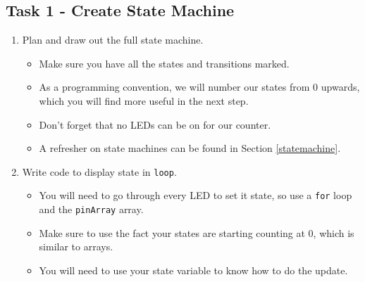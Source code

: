 \documentclass{article}
\begin{document}
    \subsection{Task 1 - Create State Machine}
        \begin{enumerate}
            \item Plan and draw out the full state machine.
            \begin{itemize}
                \item Make sure you have all the states and transitions marked. 
                \item As a programming convention, we will number our states from 0 upwards, which you will find more useful in the next step.
                \item Don't forget that no LEDs can be on for our counter.
                \item A refresher on state machines can be found in Section \ref{statemachine}.
            \end{itemize}
            \item Write code to display state in \texttt{loop}.
            \begin{itemize}
                \item You will need to go through every LED to set it state, so use a \texttt{for} loop and the \texttt{pinArray} array.
                \item Make sure to use the fact your states are starting counting at 0, which is similar to arrays. 
                \item You will need to use your state variable to know how to do the update.
            \end{itemize}
        \end{enumerate}
\end{document}
